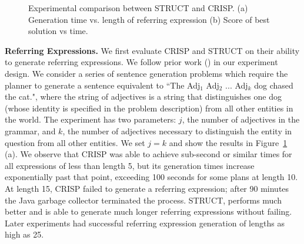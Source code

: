 \begin{figure}
\caption{Experimental comparison between STRUCT and  CRISP. (a)
  Generation time vs. length of referring expression (b) Score of best
solution vs time.}
\label{crisp-comparison}
\end{figure}

{\bf Referring Expressions.} We first evaluate CRISP and STRUCT on their ability to generate
referring expressions. We follow prior work (\cite{koller_experiences_2011})
in our experiment design.  We consider a series of sentence
generation problems which require the planner to generate a sentence
equivalent to ``The Adj$_1$ Adj$_2$ ... Adj$_k$ dog chased the cat.",
where the string of adjectives is a string that distinguishes one
dog (whose identity is specified in the problem description) from
all other entities in the world.
The experiment has two parameters: $j$, the number of adjectives in
the grammar, and $k$, the number of adjectives necessary to
distinguish the entity in question from all other entities. We set $j
= k$ and show the results in Figure~\ref{crisp-comparison} (a).
We observe that CRISP was able to achieve
sub-second or similar times for all expressions of less than length 5, but its
generation times increase exponentially past that point, exceeding 100
seconds for some plans at length 10. At length 15, CRISP failed to
generate a referring expression; after 90 minutes the Java garbage
collector terminated the process. STRUCT, performs much better and
is able to generate much longer referring expressions without failing.
Later experiments had successful referring expression generation of lengths
as high as 25.

